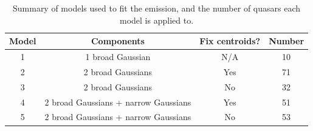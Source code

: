 \begin{table}
  \centering
  \small 
  \caption{Summary of models used to fit the \ha emission, and the number of quasars each model is applied to.}
  \label{tab:hamod}
    \begin{tabular}{cccc} 
    \hline
    Model     & Components & Fix centroids? & Number \\
    \hline
    1        & 1 broad Gaussian  & N/A &  10 \\
    2        & 2 broad Gaussians & Yes &  71 \\
    3        & 2 broad Gaussians & No  &  32 \\
    4        & 2 broad Gaussians + narrow Gaussians & Yes & 51 \\
    5        & 2 broad Gaussians + narrow Gaussians & No  & 53 \\
    \hline
    \end{tabular}
\end{table} 

